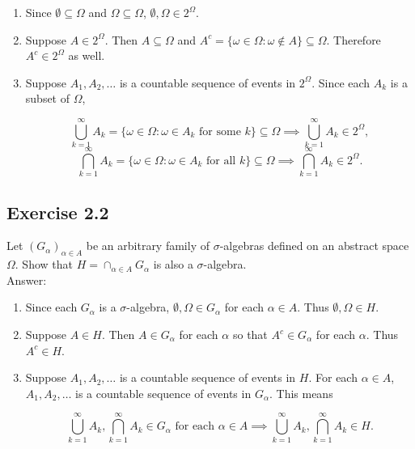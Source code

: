 \documentclass{article}
\begin{document}
\begin{enumerate}
\item Since $\emptyset \subseteq \Omega$ and $\Omega \subseteq \Omega$, $\emptyset,\Omega \in 2^\Omega$.

\item Suppose $A \in 2^\Omega$. Then $A \subseteq \Omega$ and $A^c = \{\omega \in \Omega : \omega \notin A\} \subseteq \Omega$. Therefore $A^c \in 2^\Omega$ as well.


\item Suppose $A_1, A_2, \dots$ is a countable sequence of events in $2^\Omega$. Since each $A_k$ is a subset of $\Omega$,

$$\bigcup_{k=1}^\infty A_k = \{\omega \in \Omega : \omega \in A_k \text{ for some } k \} \subseteq \Omega \implies \bigcup_{k=1}^\infty A_k \in 2^\Omega,$$
$$\bigcap_{k=1}^\infty A_k = \{\omega \in \Omega : \omega \in A_k \text{ for all } k \} \subseteq \Omega \implies \bigcap_{k=1}^\infty A_k \in 2^\Omega.$$
\end{enumerate}

\subsection*{Exercise 2.2}

Let $(G_\alpha)_{\alpha \in A}$ be an arbitrary family of $\sigma$-algebras defined on an abstract
space $\Omega$. Show that $H = \cap_{\alpha \in A} G_\alpha$ is also a $\sigma$-algebra. \\

Answer:

\begin{enumerate}
\item Since each $G_\alpha$ is a $\sigma$-algebra, $\emptyset, \Omega \in G_\alpha$ for each $\alpha \in A$. Thus $\emptyset, \Omega \in H$. 

\item Suppose $A \in H$. Then $A \in G_\alpha$ for each $\alpha$ so that $A^c \in G_\alpha$ for each $\alpha$. Thus $A^c \in H$. 


\item Suppose $A_1, A_2, \dots$ is a countable sequence of events in $H$. For each $\alpha \in A$, $A_1, A_2, \dots$ is a countable sequence of events in $G_\alpha$. This means

$$\bigcup_{k=1}^\infty A_k, \bigcap_{k=1}^\infty A_k \in G_\alpha \text{ for each } \alpha \in A \implies \bigcup_{k=1}^\infty A_k, \bigcap_{k=1}^\infty A_k \in H.$$
\end{enumerate}
\end{document}
